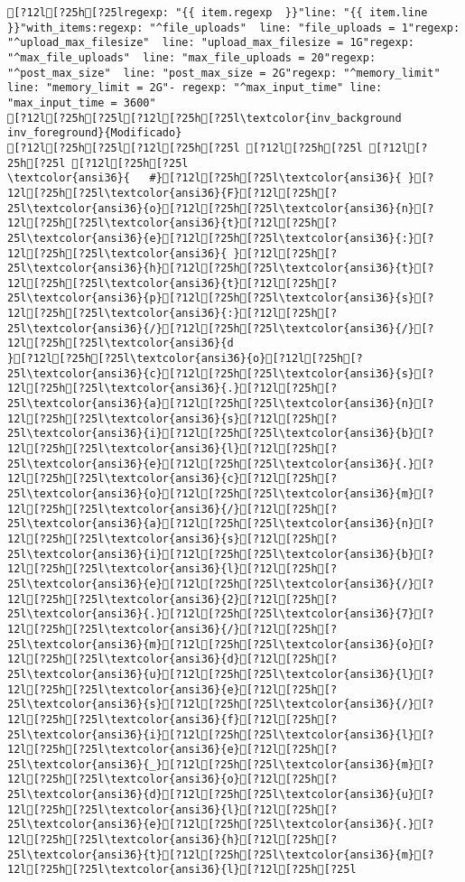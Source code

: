\documentclass{scrartcl}
\begin{document}
\begin{Verbatim}
[?12l[?25h[?25lregexp: "{{ item.regexp  }}"line: "{{ item.line }}"with_items:regexp: "^file_uploads"  line: "file_uploads = 1"regexp: "^upload_max_filesize"  line: "upload_max_filesize = 1G"regexp: "^max_file_uploads"  line: "max_file_uploads = 20"regexp: "^post_max_size"  line: "post_max_size = 2G"regexp: "^memory_limit"  line: "memory_limit = 2G"- regexp: "^max_input_time" line: "max_input_time = 3600"
[?12l[?25h[?25l[?12l[?25h[?25l\textcolor{inv_background inv_foreground}{Modificado}
[?12l[?25h[?25l[?12l[?25h[?25l [?12l[?25h[?25l [?12l[?25h[?25l [?12l[?25h[?25l
\textcolor{ansi36}{   #}[?12l[?25h[?25l\textcolor{ansi36}{ }[?12l[?25h[?25l\textcolor{ansi36}{F}[?12l[?25h[?25l\textcolor{ansi36}{o}[?12l[?25h[?25l\textcolor{ansi36}{n}[?12l[?25h[?25l\textcolor{ansi36}{t}[?12l[?25h[?25l\textcolor{ansi36}{e}[?12l[?25h[?25l\textcolor{ansi36}{:}[?12l[?25h[?25l\textcolor{ansi36}{ }[?12l[?25h[?25l\textcolor{ansi36}{h}[?12l[?25h[?25l\textcolor{ansi36}{t}[?12l[?25h[?25l\textcolor{ansi36}{t}[?12l[?25h[?25l\textcolor{ansi36}{p}[?12l[?25h[?25l\textcolor{ansi36}{s}[?12l[?25h[?25l\textcolor{ansi36}{:}[?12l[?25h[?25l\textcolor{ansi36}{/}[?12l[?25h[?25l\textcolor{ansi36}{/}[?12l[?25h[?25l\textcolor{ansi36}{d
}[?12l[?25h[?25l\textcolor{ansi36}{o}[?12l[?25h[?25l\textcolor{ansi36}{c}[?12l[?25h[?25l\textcolor{ansi36}{s}[?12l[?25h[?25l\textcolor{ansi36}{.}[?12l[?25h[?25l\textcolor{ansi36}{a}[?12l[?25h[?25l\textcolor{ansi36}{n}[?12l[?25h[?25l\textcolor{ansi36}{s}[?12l[?25h[?25l\textcolor{ansi36}{i}[?12l[?25h[?25l\textcolor{ansi36}{b}[?12l[?25h[?25l\textcolor{ansi36}{l}[?12l[?25h[?25l\textcolor{ansi36}{e}[?12l[?25h[?25l\textcolor{ansi36}{.}[?12l[?25h[?25l\textcolor{ansi36}{c}[?12l[?25h[?25l\textcolor{ansi36}{o}[?12l[?25h[?25l\textcolor{ansi36}{m}[?12l[?25h[?25l\textcolor{ansi36}{/}[?12l[?25h[?25l\textcolor{ansi36}{a}[?12l[?25h[?25l\textcolor{ansi36}{n}[?12l[?25h[?25l\textcolor{ansi36}{s}[?12l[?25h[?25l\textcolor{ansi36}{i}[?12l[?25h[?25l\textcolor{ansi36}{b}[?12l[?25h[?25l\textcolor{ansi36}{l}[?12l[?25h[?25l\textcolor{ansi36}{e}[?12l[?25h[?25l\textcolor{ansi36}{/}[?12l[?25h[?25l\textcolor{ansi36}{2}[?12l[?25h[?25l\textcolor{ansi36}{.}[?12l[?25h[?25l\textcolor{ansi36}{7}[?12l[?25h[?25l\textcolor{ansi36}{/}[?12l[?25h[?25l\textcolor{ansi36}{m}[?12l[?25h[?25l\textcolor{ansi36}{o}[?12l[?25h[?25l\textcolor{ansi36}{d}[?12l[?25h[?25l\textcolor{ansi36}{u}[?12l[?25h[?25l\textcolor{ansi36}{l}[?12l[?25h[?25l\textcolor{ansi36}{e}[?12l[?25h[?25l\textcolor{ansi36}{s}[?12l[?25h[?25l\textcolor{ansi36}{/}[?12l[?25h[?25l\textcolor{ansi36}{f}[?12l[?25h[?25l\textcolor{ansi36}{i}[?12l[?25h[?25l\textcolor{ansi36}{l}[?12l[?25h[?25l\textcolor{ansi36}{e}[?12l[?25h[?25l\textcolor{ansi36}{_}[?12l[?25h[?25l\textcolor{ansi36}{m}[?12l[?25h[?25l\textcolor{ansi36}{o}[?12l[?25h[?25l\textcolor{ansi36}{d}[?12l[?25h[?25l\textcolor{ansi36}{u}[?12l[?25h[?25l\textcolor{ansi36}{l}[?12l[?25h[?25l\textcolor{ansi36}{e}[?12l[?25h[?25l\textcolor{ansi36}{.}[?12l[?25h[?25l\textcolor{ansi36}{h}[?12l[?25h[?25l\textcolor{ansi36}{t}[?12l[?25h[?25l\textcolor{ansi36}{m}[?12l[?25h[?25l\textcolor{ansi36}{l}[?12l[?25h[?25l

\end{Verbatim}
\end{document}
